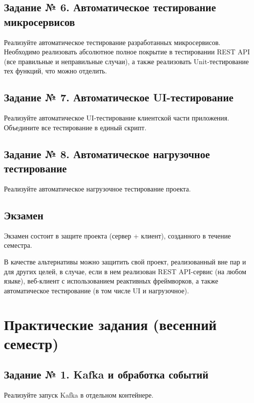 \documentclass{article}
\begin{document}
\subsection{Задание № 6. Автоматическое тестирование микросервисов}

Реализуйте автоматическое тестирование разработанных микросервисов.
Необходимо реализовать абсолютное полное покрытие в тестировании REST API 
(все правильные и неправильные случаи), а также реализовать Unit-тестирование 
тех функций, что можно отделить.

\subsection{Задание № 7. Автоматическое UI-тестирование}

Реализуйте автоматическое UI-тестирование клиентской части приложения.
Объедините все тестирование в единый скрипт.

\subsection{Задание № 8. Автоматическое нагрузочное тестирование}

Реализуйте автоматическое нагрузочное тестирование проекта.

\subsection{Экзамен}

Экзамен состоит в защите проекта (сервер + клиент), созданного в течение
семестра.

В качестве альтернативы можно защитить свой проект, реализованный вне пар
и для других целей, в случае, если в нем реализован REST API-сервис
(на любом языке), веб-клиент с использованием реактивных фреймворков,
а также автоматическое тестирование (в том числе UI и нагрузочное).

\section{Практические задания (весенний семестр)}

\subsection{Задание № 1. Kafka и обработка событий}

Реализуйте запуск Kafka в отдельном контейнере.
\end{document}
